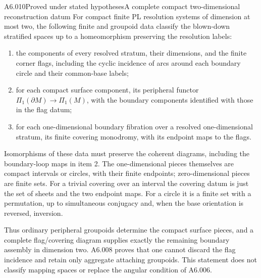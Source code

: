\begin{saresult}{A6.010}{Proved under stated hypotheses}{A complete compact two-dimensional reconstruction datum}
For compact finite PL resolution systems of dimension at most two,
the following finite and groupoid data classify the blown-down
stratified spaces up to a homeomorphism preserving the resolution
labels:
\begin{enumerate}
\item the components of every resolved stratum, their dimensions,
and the finite corner flags, including the cyclic incidence of
arcs around each boundary circle and their common-base labels;
\item for each compact surface component, its peripheral functor
$\Pi_1(\partial M)\to\Pi_1(M)$, with the boundary components
identified with those in the flag datum;
\item for each one-dimensional boundary fibration over a resolved
one-dimensional stratum, its finite covering monodromy, with its
endpoint maps to the flags.
\end{enumerate}
Isomorphisms of these data must preserve the coherent diagrams,
including the boundary-loop maps in item 2. The one-dimensional
pieces themselves are compact intervals or circles, with their
finite endpoints; zero-dimensional pieces are finite sets.
For a trivial covering over an interval the covering datum is just
the set of sheets and the two endpoint maps. For a circle it is a
finite set with a permutation, up to simultaneous conjugacy and,
when the base orientation is reversed, inversion.

Thus ordinary peripheral groupoids determine the compact surface
pieces, and a complete flag/covering diagram supplies exactly the
remaining boundary assembly in dimension two. A6.008 proves that
one cannot discard the flag incidence and retain only aggregate
attaching groupoids. This statement does not classify mapping
spaces or replace the angular condition of A6.006.
\end{saresult}
